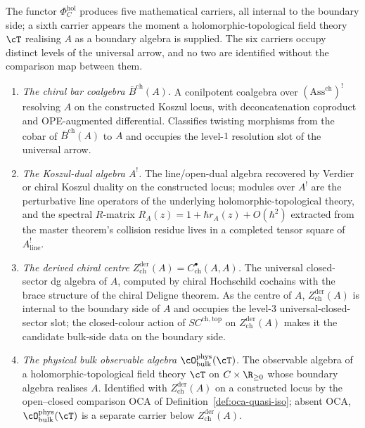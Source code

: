 \begin{remark}
\label{rem:six-carrier-boundary-holographic}
The functor $\Phi^{\mathrm{hol}}_C$ produces five mathematical carriers, all internal to the boundary side; a sixth carrier appears the moment a holomorphic-topological field theory $\cT$ realising $A$ as a boundary algebra is supplied. The six carriers occupy distinct levels of the universal arrow, and no two are identified without the comparison map between them.

\begin{enumerate}[label=\textup{(C\arabic*)}]
 \item \emph{The chiral bar coalgebra $\bar B^{\mathrm{ch}}(A)$.} A conilpotent coalgebra over $(\mathrm{Ass}^{\mathrm{ch}})^!$ resolving $A$ on the constructed Koszul locus, with deconcatenation coproduct and OPE-augmented differential. Classifies twisting morphisms from the cobar of $\bar B^{\mathrm{ch}}(A)$ to $A$ and occupies the level-$1$ resolution slot of the universal arrow.
 \item \emph{The Koszul-dual algebra $A^!$.} The line/open-dual algebra recovered by Verdier or chiral Koszul duality on the constructed locus; modules over $A^!$ are the perturbative line operators of the underlying holomorphic-topological theory, and the spectral $R$-matrix $R_A(z) = 1 + \hbar r_A(z) + O(\hbar^2)$ extracted from the master theorem's collision residue lives in a completed tensor square of $A^!_{\mathrm{line}}$.
 \item \emph{The derived chiral centre $Z^{\mathrm{der}}_{\mathrm{ch}}(A) = C^\bullet_{\mathrm{ch}}(A, A)$.} The universal closed-sector dg algebra of $A$, computed by chiral Hochschild cochains with the brace structure of the chiral Deligne theorem. As the centre of $A$, $Z^{\mathrm{der}}_{\mathrm{ch}}(A)$ is internal to the boundary side of $A$ and occupies the level-$3$ universal-closed-sector slot; the closed-colour action of $SC^{\mathrm{ch}, \mathrm{top}}$ on $Z^{\mathrm{der}}_{\mathrm{ch}}(A)$ makes it the candidate bulk-side data on the boundary side.
 \item \emph{The physical bulk observable algebra $\cO^{\mathrm{phys}}_{\mathrm{bulk}}(\cT)$.} The observable algebra of a holomorphic-topological field theory $\cT$ on $C \times \R_{\geq 0}$ whose boundary algebra realises $A$. Identified with $Z^{\mathrm{der}}_{\mathrm{ch}}(A)$ on a constructed locus by the open--closed comparison $\mathrm{OCA}$ of Definition~\ref{def:oca-quasi-iso}; absent $\mathrm{OCA}$, $\cO^{\mathrm{phys}}_{\mathrm{bulk}}(\cT)$ is a separate carrier below $Z^{\mathrm{der}}_{\mathrm{ch}}(A)$.

\end{enumerate}
\end{remark}
